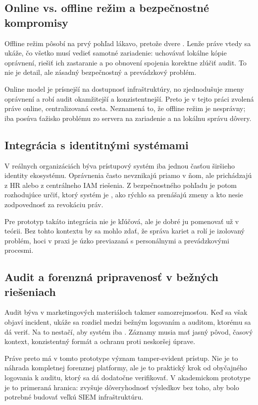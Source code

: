 \documentclass[journal,a4paper,onecolumn]{IEEEtran}
\begin{document}
\subsection{Online vs. offline režim a bezpečnostné kompromisy}

Offline režim pôsobí na prvý pohľad lákavo, pretože dvere . Lenže práve vtedy sa ukáže, čo všetko musí vedieť samotné zariadenie: uchovávať lokálne kópie oprávnení, riešiť ich zastaranie a po obnovení spojenia korektne zlúčiť audit. To nie je detail, ale zásadný bezpečnostný a prevádzkový problém.

Online model je prísnejší na dostupnosť infraštruktúry, no zjednodušuje zmeny oprávnení a robí audit okamžitejší a konzistentnejší. Preto je v tejto práci zvolená práve online, centralizovaná cesta. Neznamená to, že offline režim je nesprávny; iba posúva ťažisko problému zo servera na zariadenie a na lokálnu správu dôvery.

\subsection{Integrácia s identitnými systémami}

V reálnych organizáciách býva prístupový systém iba jednou časťou širšieho identity ekosystému. Oprávnenia často nevznikajú priamo v ňom, ale prichádzajú z HR alebo z centrálneho IAM riešenia. Z bezpečnostného pohľadu je potom rozhodujúce určiť, ktorý systém je , ako rýchlo sa prenášajú zmeny a kto nesie zodpovednosť za revokáciu práv.

Pre prototyp takáto integrácia nie je kľúčová, ale je dobré ju pomenovať už v teórii. Bez tohto kontextu by sa mohlo zdať, že správa kariet a rolí je izolovaný problém, hoci v praxi je úzko previazaná s personálnymi a prevádzkovými procesmi.

\subsection{Audit a forenzná pripravenosť v bežných riešeniach}

Audit býva v marketingových materiáloch takmer samozrejmosťou. Keď sa však objaví incident, ukáže sa rozdiel medzi bežným logovaním a auditom, ktorému sa dá veriť. Na to nestačí, aby systém iba . Záznamy musia mať jasný pôvod, časový kontext, konzistentný formát a ochranu proti neskoršej úprave.

Práve preto má v tomto prototype význam tamper-evident prístup. Nie je to náhrada kompletnej forenznej platformy, ale je to praktický krok od obyčajného logovania k auditu, ktorý sa dá dodatočne verifikovať. V akademickom prototype je to primeraná hranica: zvyšuje dôveryhodnosť výsledkov bez toho, aby bolo potrebné budovať veľkú SIEM infraštruktúru.
\end{document}
